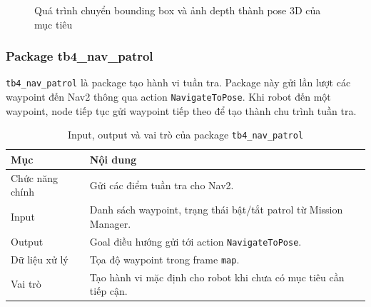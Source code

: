 \begin{figure}[H]
\centering
{}
\caption{Quá trình chuyển bounding box và ảnh depth thành pose 3D của mục tiêu}
\label{fig:object-localization-flow}
\end{figure}

\subsubsection{Package tb4\_nav\_patrol}
\label{subsubsec:tb4-nav-patrol}

\texttt{tb4\_nav\_patrol} là package tạo hành vi tuần tra. Package này gửi lần lượt các waypoint đến Nav2 thông qua action \texttt{NavigateToPose}. Khi robot đến một waypoint, node tiếp tục gửi waypoint tiếp theo để tạo thành chu trình tuần tra.

\begin{table}[H]
    \centering
    \caption{Input, output và vai trò của package \texttt{tb4\_nav\_patrol}}
    \label{tab:tb4-nav-patrol}
    \renewcommand{\arraystretch}{1.25}
    \small
    \begin{tabularx}{\textwidth}{|>{\raggedright\arraybackslash}p{}|>{\raggedright\arraybackslash}X|}
        \hline
        \textbf{Mục} & \textbf{Nội dung} \\
        \hline
        Chức năng chính & Gửi các điểm tuần tra cho Nav2. \\
        \hline
        Input & Danh sách waypoint, trạng thái bật/tắt patrol từ Mission Manager. \\
        \hline
        Output & Goal điều hướng gửi tới action \texttt{NavigateToPose}. \\
        \hline
        Dữ liệu xử lý & Tọa độ waypoint trong frame \texttt{map}. \\
        \hline
        Vai trò & Tạo hành vi mặc định cho robot khi chưa có mục tiêu cần tiếp cận. \\
        \hline
    \end{tabularx}
\end{table}

